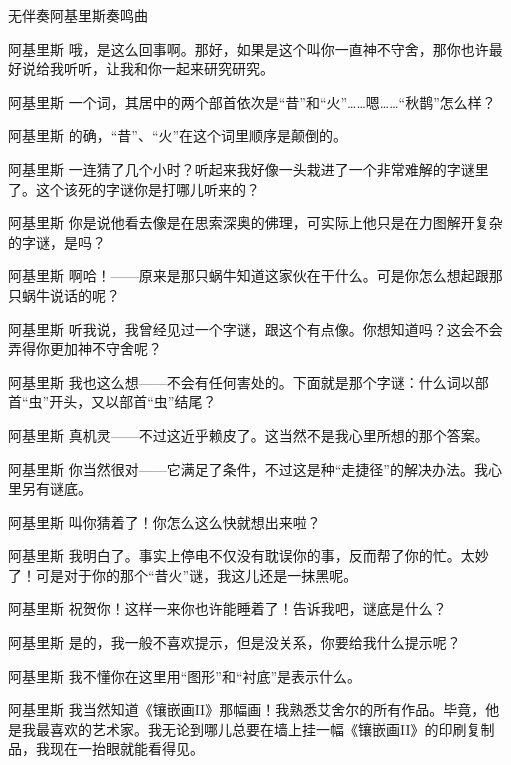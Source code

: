 \begin{dialog}{无伴奏阿基里斯奏鸣曲}
\begin{dialogue}
\item[阿基里斯]哦，是这么回事啊。那好，如果是这个叫你一直神不守舍，那你也许最好说给我听听，让我和你一起来研究研究。

\item[阿基里斯]一个词，其居中的两个部首依次是“昔”和“火”……嗯……“秋鹊”怎么样？

\item[阿基里斯]的确，“昔”、“火”在这个词里顺序是颠倒的。

\item[阿基里斯]一连猜了几个小时？听起来我好像一头栽进了一个非常难解的字谜里了。这个该死的字谜你是打哪儿听来的？

\item[阿基里斯]你是说他看去像是在思索深奥的佛理，可实际上他只是在力图解开复杂的字谜，是吗？

\item[阿基里斯]啊哈！——原来是那只蜗牛知道这家伙在干什么。可是你怎么想起跟那只蜗牛说话的呢？

\item[阿基里斯]听我说，我曾经见过一个字谜，跟这个有点像。你想知道吗？这会不会弄得你更加神不守舍呢？

\item[阿基里斯]我也这么想——不会有任何害处的。下面就是那个字谜：什么词以部首“虫”开头，又以部首“虫”结尾？

\item[阿基里斯]真机灵——不过这近乎赖皮了。这当然不是我心里所想的那个答案。

\item[阿基里斯]你当然很对——它满足了条件，不过这是种“走捷径”的解决办法。我心里另有谜底。

\item[阿基里斯]叫你猜着了！你怎么这么快就想出来啦？

\item[阿基里斯]我明白了。事实上停电不仅没有耽误你的事，反而帮了你的忙。太妙了！可是对于你的那个“昔火”谜，我这儿还是一抹黑呢。

\item[阿基里斯]祝贺你！这样一来你也许能睡着了！告诉我吧，谜底是什么？

\item[阿基里斯]是的，我一般不喜欢提示，但是没关系，你要给我什么提示呢？

\item[阿基里斯]我不懂你在这里用“图形”和“衬底”是表示什么。

\item[阿基里斯]我当然知道《镶嵌画II》那幅画！我熟悉艾舍尔的所有作品。毕竟，他是我最喜欢的艺术家。我无论到哪儿总要在墙上挂一幅《镶嵌画II》的印刷复制品，我现在一抬眼就能看得见。


\end{dialogue}
\end{dialog}
